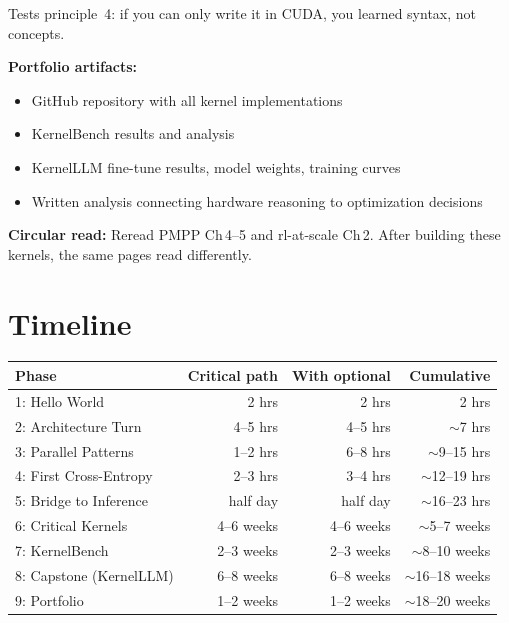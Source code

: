 \documentclass[11pt, letterpaper]{article}
\begin{document}
\smallskip
Tests principle~4: if you can only write it in CUDA, you learned syntax, not concepts.

\begin{samepage}
\textbf{Portfolio artifacts:}
\begin{itemize}
\item GitHub repository with all kernel implementations
\item KernelBench results and analysis
\item KernelLLM fine-tune results, model weights, training curves
\item Written analysis connecting hardware reasoning to optimization decisions
\end{itemize}
\end{samepage}

\textbf{Circular read:} Reread PMPP Ch\,4--5 and rl-at-scale Ch\,2. After building these kernels, the same pages read differently.

\section{Timeline}

\begin{center}
\begin{tabularx}{\textwidth}{@{}Xrrr@{}}
\toprule
\textbf{Phase} & \textbf{Critical path} & \textbf{With optional} & \textbf{Cumulative} \\
\midrule
1: Hello World & 2 hrs & 2 hrs & 2 hrs \\
2: Architecture Turn & 4--5 hrs & 4--5 hrs & $\sim$7 hrs \\
3: Parallel Patterns & 1--2 hrs & 6--8 hrs & $\sim$9--15 hrs \\
4: First Cross-Entropy & 2--3 hrs & 3--4 hrs & $\sim$12--19 hrs \\
5: Bridge to Inference & half day & half day & $\sim$16--23 hrs \\
\midrule
6: Critical Kernels & 4--6 weeks & 4--6 weeks & $\sim$5--7 weeks \\
7: KernelBench & 2--3 weeks & 2--3 weeks & $\sim$8--10 weeks \\
8: Capstone (KernelLLM) & 6--8 weeks & 6--8 weeks & $\sim$16--18 weeks \\
9: Portfolio & 1--2 weeks & 1--2 weeks & $\sim$18--20 weeks \\
\bottomrule
\end{tabularx}
\end{center}
\end{document}

